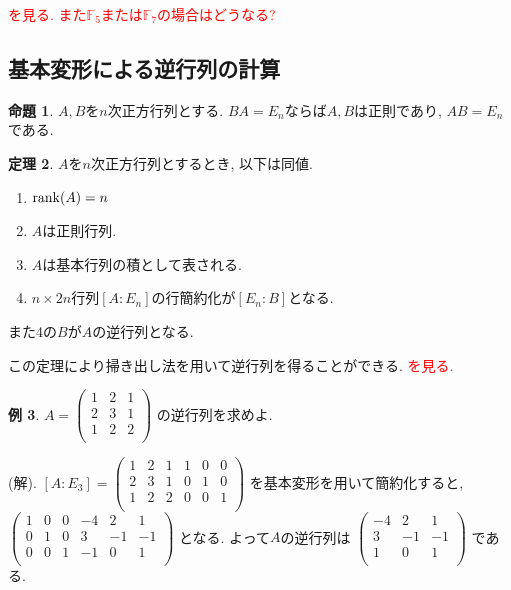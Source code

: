 \documentclass[dvipdfmx,a4paper,11pt]{article} %
\newcommand{\xr}[1]{\textcolor{red}{#1}}
\theoremstyle{definition}
\newtheorem{thm}{定理}
\newtheorem{prop}[thm]{命題}
\newtheorem{exa}[thm]{例}
\begin{document}
 \xr{\cite[例 2.4.7]{O}を見る. また$\mathbb{F}_5$または$\mathbb{F}_7$の場合はどうなる?}


\subsection{基本変形による逆行列の計算 \cite[2.5節]{O}}

    \begin{prop}\cite[命題 2.5.3]{O}
    $A, B$を$n$次正方行列とする. 
    $BA=E_n$ならば$A, B$は正則であり, $AB=E_n$である. 
  \end{prop}

 
    \begin{thm}\cite[命題 2.5.1, 定理 2.5.4]{O}
    \label{thm-regular-2}
$A$を$n$次正方行列とするとき, 以下は同値.
    \begin{enumerate}
  \setlength{\parskip}{0cm} 
  \setlength{\itemsep}{0cm}
\item $\rank (A) =n$
\item $A$は正則行列.
\item $A$は基本行列の積として表される. 
\item $n \times 2n$行列$[A : E_n]$の行簡約化が$[E_n : B]$となる. 
\end{enumerate}
また4の$B$が$A$の逆行列となる. 
  \end{thm}
 この定理により掃き出し法を用いて逆行列を得ることができる.
  \xr{\cite[例 2.5.5]{O}を見る.}

 \begin{exa}
 $
  A=\begin{pmatrix}
 1& 2&1 \\
 2& 3 & 1 \\
 1& 2 &  2 \\
 \end{pmatrix} 
 $
 の逆行列を求めよ.
 
 (解).
 $[A:E_3] = 
 \begin{pmatrix}
 1& 2&1  &1& 0&0 \\
 2& 3 & 1 &0& 1&0 \\
 1& 2 &  2 &0& 0&1 \\
 \end{pmatrix} 
 $
 を基本変形を用いて簡約化すると, \\
 $
 \begin{pmatrix}
 1& 0&0  &-4& 2&1 \\
 0& 1 & 0 &3& -1&-1 \\
 0& 0&  1 &-1& 0&1 \\
 \end{pmatrix} 
 $
 となる. よって$A$の逆行列は
 $
 \begin{pmatrix}
-4& 2&1 \\
3& -1&-1\\
1& 0&1 \\
 \end{pmatrix} 
 $
 である.
 \end{exa}
\end{document}
